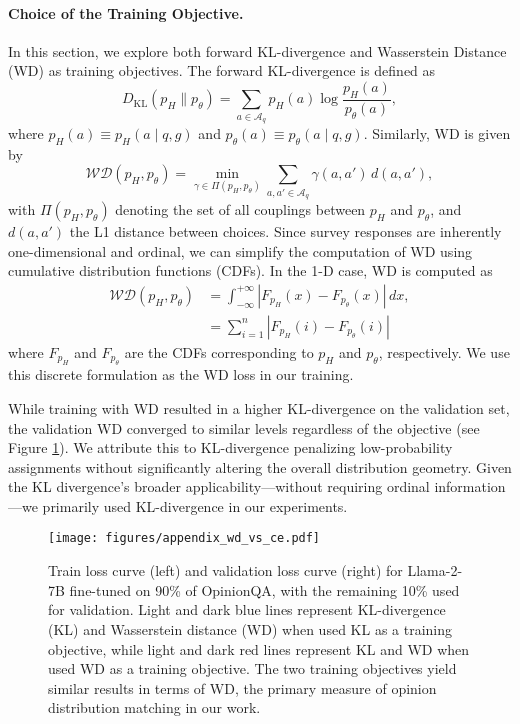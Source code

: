 \paragraph{Choice of the Training Objective.}
\label{appendix_training_train_objective}
In this section, we explore both forward KL-divergence and Wasserstein Distance (WD) as training objectives. The forward KL-divergence is defined as
\[
D_{\mathrm{KL}}(p_H \| p_{\theta}) = \sum_{a \in \mathcal{A}_q} p_H(a) \log \frac{p_H(a)}{p_{\theta}(a)},
\]
where \(p_H(a) \equiv p_H(a \mid q, g)\) and \(p_{\theta}(a) \equiv p_{\theta}(a \mid q, g)\). Similarly, WD is given by
\[
\mathcal{WD}(p_H, p_{\theta}) = \min_{\gamma \in \Pi(p_H,p_{\theta})} \sum_{a,a' \in \mathcal{A}_q} \gamma(a,a')\, d(a,a'),
\]
with \(\Pi(p_H,p_{\theta})\) denoting the set of all couplings between \(p_H\) and \(p_{\theta}\), and \(d(a,a')\) the L1 distance between choices.
Since survey responses are inherently one-dimensional and ordinal, we can simplify the computation of WD using cumulative distribution functions (CDFs). In the 1-D case, WD is computed as
\begin{align*}
    \mathcal{WD}(p_H, p_{\theta}) 
    &= \int_{-\infty}^{+\infty} \left| F_{p_H}(x) - F_{p_{\theta}}(x) \right| \, dx, \\
    &= \sum_{i=1}^{n} \left| F_{p_H}(i) - F_{p_{\theta}}(i) \right|
\end{align*}
where \(F_{p_H}\) and \(F_{p_{\theta}}\) are the CDFs corresponding to \(p_H\) and \(p_{\theta}\), respectively.
We use this discrete formulation as the WD loss in our training.

While training with WD resulted in a higher KL-divergence on the validation set, the validation WD converged to similar levels regardless of the objective (see Figure \ref{fig:wd_vs_ce_loss}). We attribute this to KL-divergence penalizing low-probability assignments without significantly altering the overall distribution geometry. Given the KL divergence's broader applicability—without requiring ordinal information—we primarily used KL-divergence in our experiments.

\begin{figure}[!t]
    \captionsetup{font=small}
    \texttt{[image: figures/appendix\_wd\_vs\_ce.pdf]}
    \caption{
    Train loss curve (left) and validation loss curve (right) for Llama-2-7B
    fine-tuned on 90\% of OpinionQA, with the remaining 10\% used for validation.
    Light and dark blue lines represent KL-divergence (KL) and Wasserstein distance (WD) when used KL as a training objective,
    while light and dark red lines represent KL and WD when used WD as a training objective.
    The two training objectives yield similar results in terms of WD, the primary measure of opinion distribution matching in our work.
    }
    \label{fig:wd_vs_ce_loss}
\end{figure}
